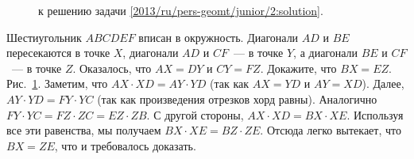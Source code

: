 \ifsolution
\begin{figure}\centering
    \caption{к решению задачи \ref{2013/ru/pers-geomt/junior/2:solution}.}
    \label{2013/ru/pers-geomt/junior/2:solution:fig}
\end{figure}%
\fi %

\problem
Шестиугольник $ABCDEF$ вписан в окружность.
Диагонали $AD$ и $BE$ пересекаются в точке $X$, диагонали $AD$ и $CF$~--- в
точке $Y$, а диагонали $BE$ и $CF$~--- в точке $Z$.
Оказалось, что $AX = DY$ и $CY = FZ$.
Докажите, что $BX = EZ$.
\solution
\label{2013/ru/pers-geomt/junior/2:solution}%
Рис.~\ref{2013/ru/pers-geomt/junior/2:solution:fig}.
Заметим, что $AX \cdot XD = AY \cdot YD$ (так как $AX = YD$ и $AY = XD$).
Далее, $AY \cdot YD = FY \cdot YC$ (так как произведения отрезков хорд равны).
Аналогично $FY \cdot YC = FZ \cdot ZC = EZ \cdot ZB$.
С другой стороны, $AX \cdot XD = BX \cdot XE$.
Используя все эти равенства, мы получаем $BX \cdot XE = BZ \cdot ZE$.
Отсюда легко вытекает, что $BX = ZE$, что и требовалось доказать.
\endproblem
